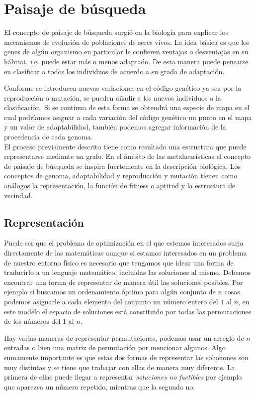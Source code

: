 \section{Paisaje de búsqueda}
El concepto de paisaje de búsqueda surgió en la biología para explicar los mecanismos de evolución de poblaciones de seres vivos\cite{wright1932roles}. La idea básica es que los genes de algún organismo en particular le confieren ventajas o desventajas en su hábitat, i.e. puede estar más o menos adaptado. De esta manera puede pensarse en clasificar a todos los individuos de acuerdo a su grada de adaptación. 

Conforme se introducen nuevas variaciones en el código genético ya sea por la reproducción o mutación, se pueden añadir a los nuevos individuos a la clasificación. Si se continua de esta forma se obtendrá una especie de mapa en el cual podríamos asignar a cada variación del código genético un punto en el mapa y un valor de adaptabilidad, también podemos agregar información de la procedencia de cada genoma.\\

El proceso previamente descrito tiene como resultado una estructura que puede representarse mediante un grafo. En el ámbito de las metaheurísticas el concepto de paisaje de búsqueda se inspira fuertemente en la descripción biológica. Los conceptos de genoma, adaptabilidad y reproducción y mutación tienen como análogos la representación, la función de fitness o aptitud y la estructura de vecindad.   

\subsection{Representación}
Puede ser que el problema de optimización en el que estemos interesados surja directamente de las matemáticas aunque si estamos interesados en un problema de nuestro entorno físico es necesario que tengamos que idear una forma de traducirlo a un lenguaje matemático, incluidas las soluciones al mismo. Debemos encontrar una forma de representar de manera útil las soluciones posibles.
Por ejemplo si buscamos un ordenamiento óptimo para algún conjunto de $n$ cosas podemos asignarle a cada elemento del conjunto un número entero del $1$ al $n$, en este modelo el espacio de soluciones está constituido por todas las permutaciones de los números del $1$ al $n$. 

Hay varias maneras de representar permutaciones, podemos usar un arreglo de $n$ entradas o bien una matriz de permutación por mencionar algunos. Algo sumamente importante es que estas dos formas de representar las soluciones son muy distintas y se tiene que trabajar con ellas de manera muy diferente. La primera de ellas puede llegar a representar \textit{soluciones no factibles} por ejemplo que aparezca un número repetido, mientras que la segunda no.

